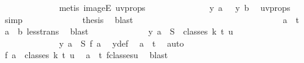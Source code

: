 \begin{isabellebody}
\ \ \ \ \ \ \ \ \ \ \ \ \isamarkupfalse%
\ {\isacharparenleft}{\kern0pt}metis\ imageE\ uv{\isacharunderscore}{\kern0pt}props{\isacharparenright}{\kern0pt}\isanewline
\ \ \ \ \ \ \ \ \ \ \isamarkupfalse%
\ \isamarkupfalse%
\ {\isachardoublequoteopen}{\isasymchi}\ {\isacharparenleft}{\kern0pt}y\ a{\isacharparenright}{\kern0pt}\ {\isacharequal}{\kern0pt}\ {\isasymchi}\ {\isacharparenleft}{\kern0pt}y\ b{\isacharparenright}{\kern0pt}{\isachardoublequoteclose}\ \isamarkupfalse%
\ uv{\isacharunderscore}{\kern0pt}props\ \isamarkupfalse%
\ simp\isanewline
\ \ \ \ \ \ \ \ \ \ \isamarkupfalse%
\ \isamarkupfalse%
\ {\isacharquery}{\kern0pt}thesis\ \isamarkupfalse%
\ blast\isanewline
\ \ \ \ \ \ \ \ \isamarkupfalse%
\isanewline
\ \ \ \ \ \ \ \ \ \ \isamarkupfalse%
\ {}\isanewline
\ \ \ \ \ \ \ \ \ \ \isamarkupfalse%
\ \isamarkupfalse%
\ {\isachardoublequoteopen}a\ {\isacharless}{\kern0pt}\ t{\isachardoublequoteclose}\ \isamarkupfalse%
\ {\isacartoucheopen}a\ {\isacharless}{\kern0pt}\ b{\isacartoucheclose}\ less{\isacharunderscore}{\kern0pt}trans\ \isamarkupfalse%
\ blast\isanewline
\ \ \ \ \ \ \ \ \ \ \isamarkupfalse%
\ \isamarkupfalse%
\ {\isachardoublequoteopen}y\ a\ {\isasymin}\ S\ {\isacharbackquote}{\kern0pt}\ classes\ k\ t\ u{\isachardoublequoteclose}\isanewline
\ \ \ \ \ \ \ \ \ \ \isamarkupfalse%
\ {\isacharminus}{\kern0pt}\isanewline
\ \ \ \ \ \ \ \ \ \ \ \ \isamarkupfalse%
\ {\isachardoublequoteopen}y\ a\ {\isacharequal}{\kern0pt}\ S\ {\isacharparenleft}{\kern0pt}{\isacharquery}{\kern0pt}f\ a{\isacharparenright}{\kern0pt}{\isachardoublequoteclose}\ \isamarkupfalse%
\ y{\isacharunderscore}{\kern0pt}def\ \isamarkupfalse%
\ {\isacartoucheopen}a\ {\isacharless}{\kern0pt}\ t{\isacartoucheclose}\ \isamarkupfalse%
\ auto\isanewline
\ \ \ \ \ \ \ \ \ \ \ \ \isamarkupfalse%
\ \isamarkupfalse%
\ {\isachardoublequoteopen}{\isacharquery}{\kern0pt}f\ a\ {\isasymin}\ classes\ k\ t\ u{\isachardoublequoteclose}\ \isamarkupfalse%
\ {\isacartoucheopen}a\ {\isacharless}{\kern0pt}\ t{\isacartoucheclose}\ f{\isacharunderscore}{\kern0pt}classes{\isacharunderscore}{\kern0pt}u\ \isamarkupfalse%
\ blast\isanewline
\ \ \ \ \ \ \ \ \ \ \ \ \isamarkupfalse%

\end{isabellebody}
